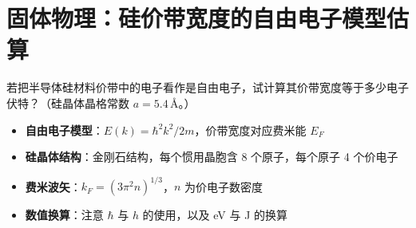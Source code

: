 \section{固体物理：硅价带宽度的自由电子模型估算}
\label{sec:si-valence-width}

\begin{modelbox}[题目：自由电子模型估算硅的价带宽度]
若把半导体硅材料价带中的电子看作是自由电子，试计算其价带宽度等于多少电子伏特？（硅晶体晶格常数 $a=5.4\,\text{\AA}$。）
\end{modelbox}

\begin{tipbox}[考点快速分析]
\begin{itemize}
    \item \textbf{自由电子模型}：$E(k)=\hbar^2k^2/2m$，价带宽度对应费米能 $E_F$
    \item \textbf{硅晶体结构}：金刚石结构，每个惯用晶胞含 8 个原子，每个原子 4 个价电子
    \item \textbf{费米波矢}：$k_F=(3\pi^2n)^{1/3}$，$n$ 为价电子数密度
    \item \textbf{数值换算}：注意 $\hbar$ 与 $h$ 的使用，以及 eV 与 J 的换算
\end{itemize}
\end{tipbox}

